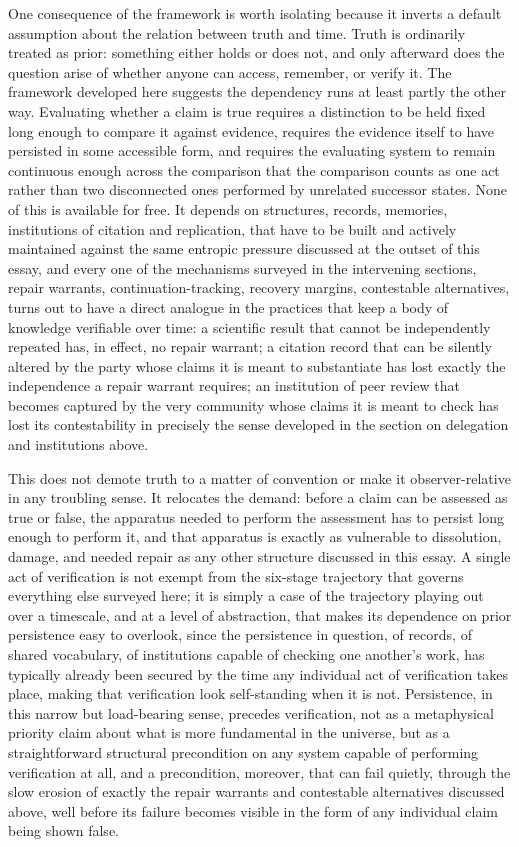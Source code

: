 \documentclass[11pt]{article}
\begin{document}
One consequence of the framework is worth isolating because it inverts a default assumption about the relation between truth and time. Truth is ordinarily treated as prior: something either holds or does not, and only afterward does the question arise of whether anyone can access, remember, or verify it. The framework developed here suggests the dependency runs at least partly the other way. Evaluating whether a claim is true requires a distinction to be held fixed long enough to compare it against evidence, requires the evidence itself to have persisted in some accessible form, and requires the evaluating system to remain continuous enough across the comparison that the comparison counts as one act rather than two disconnected ones performed by unrelated successor states. None of this is available for free. It depends on structures, records, memories, institutions of citation and replication, that have to be built and actively maintained against the same entropic pressure discussed at the outset of this essay, and every one of the mechanisms surveyed in the intervening sections, repair warrants, continuation-tracking, recovery margins, contestable alternatives, turns out to have a direct analogue in the practices that keep a body of knowledge verifiable over time: a scientific result that cannot be independently repeated has, in effect, no repair warrant; a citation record that can be silently altered by the party whose claims it is meant to substantiate has lost exactly the independence a repair warrant requires; an institution of peer review that becomes captured by the very community whose claims it is meant to check has lost its contestability in precisely the sense developed in the section on delegation and institutions above.

This does not demote truth to a matter of convention or make it observer-relative in any troubling sense. It relocates the demand: before a claim can be assessed as true or false, the apparatus needed to perform the assessment has to persist long enough to perform it, and that apparatus is exactly as vulnerable to dissolution, damage, and needed repair as any other structure discussed in this essay. A single act of verification is not exempt from the six-stage trajectory that governs everything else surveyed here; it is simply a case of the trajectory playing out over a timescale, and at a level of abstraction, that makes its dependence on prior persistence easy to overlook, since the persistence in question, of records, of shared vocabulary, of institutions capable of checking one another's work, has typically already been secured by the time any individual act of verification takes place, making that verification look self-standing when it is not. Persistence, in this narrow but load-bearing sense, precedes verification, not as a metaphysical priority claim about what is more fundamental in the universe, but as a straightforward structural precondition on any system capable of performing verification at all, and a precondition, moreover, that can fail quietly, through the slow erosion of exactly the repair warrants and contestable alternatives discussed above, well before its failure becomes visible in the form of any individual claim being shown false.
\end{document}
